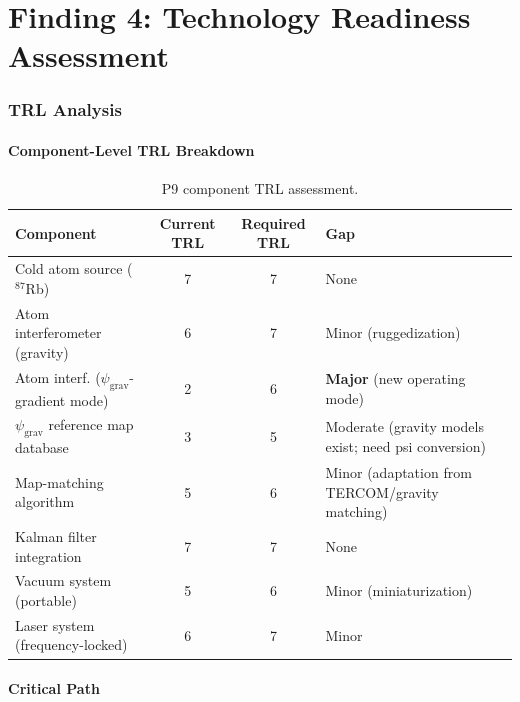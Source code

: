 \documentclass[11pt]{article}
\theoremstyle{definition}
\theoremstyle{remark}
\newcommand{\psigrav}{\psi_{\mathrm{grav}}}
\begin{document}
\part{Finding 4: Technology Readiness Assessment}
\label{part:trl}

\section{TRL Analysis}
\label{sec:trl}

\subsection{Component-Level TRL Breakdown}

\begin{table}[H]
\centering
\caption{P9 component TRL assessment.}
\label{tab:trl-components}
\begin{tabular}{@{}p{4cm}ccp{4cm}@{}}
\toprule
Component & Current TRL & Required TRL & Gap \\
\midrule
Cold atom source ($^{87}$Rb) & 7 & 7 & None \\
Atom interferometer (gravity) & 6 & 7 & Minor (ruggedization) \\
Atom interf. ($\psigrav$-gradient mode) & 2 & 6 & \textbf{Major} (new operating mode) \\
$\psigrav$ reference map database & 3 & 5 & Moderate (gravity models exist; need psi conversion) \\
Map-matching algorithm & 5 & 6 & Minor (adaptation from TERCOM/gravity matching) \\
Kalman filter integration & 7 & 7 & None \\
Vacuum system (portable) & 5 & 6 & Minor (miniaturization) \\
Laser system (frequency-locked) & 6 & 7 & Minor \\
\bottomrule
\end{tabular}
\end{table}

\subsection{Critical Path}
\end{document}

